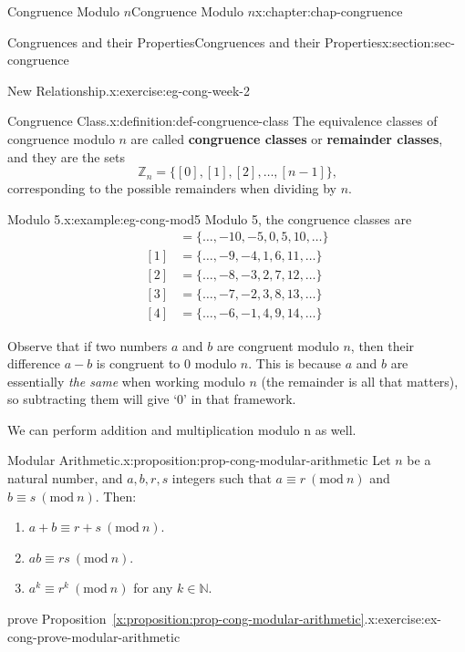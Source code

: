 \documentclass[oneside,10pt,]{book}
\newcommand{\xreffont}{\relax}
\newcommand{\terminology}[1]{\textbf{#1}}
\numberwithin{equation}{section}
\newcommand{\Mod}[1]{\ \left(\mathrm{mod}\ #1\right)}
\newcommand{\amp}{&}
\begin{document}
\begin{chapterptx}{Congruence Modulo \(n\)}{}{Congruence Modulo \(n\)}{}{}{x:chapter:chap-congruence}
\begin{sectionptx}{Congruences and their Properties}{}{Congruences and their Properties}{}{}{x:section:sec-congruence}
\begin{inlineexercise}{New Relationship.}{x:exercise:eg-cong-week-2}
\end{inlineexercise}
\begin{definition}{Congruence Class.}{x:definition:def-congruence-class}%
The equivalence classes of congruence modulo \(n\) are called \terminology{congruence classes} or \terminology{remainder classes}, and they are the sets%
\begin{equation*}
\mathbb{Z}_n = \{[0],[1],[2],\ldots,[n-1]\}\text{,}
\end{equation*}
corresponding to the possible remainders when dividing by \(n\). \label{g:notation:id444993}%
\end{definition}
\begin{example}{Modulo 5.}{x:example:eg-cong-mod5}%
Modulo 5, the congruence classes are%
\begin{align*}
[0] \amp = \{\ldots,-10,-5,0,5,10,\ldots\}\\
[1] \amp = \{\ldots,-9,-4,1,6,11,\ldots\}\\
[2] \amp = \{\ldots,-8,-3,2,7,12,\ldots\}\\
[3] \amp = \{\ldots,-7,-2,3,8,13,\ldots\}\\
[4] \amp = \{\ldots,-6,-1,4,9,14,\ldots\}
\end{align*}
%
\end{example}
Observe that if two numbers \(a\) and \(b\) are congruent modulo \(n\), then their difference \(a-b\) is congruent to 0 modulo \(n\). This is because \(a\) and \(b\) are essentially \emph{the same} when working modulo \(n\) (the remainder is all that matters), so subtracting them will give `0' in that framework.%
\par
We can perform addition and multiplication modulo \textdollar{}n\textdollar{} as well.%
\begin{proposition}{Modular Arithmetic.}{}{x:proposition:prop-cong-modular-arithmetic}%
Let \(n\) be a natural number, and \(a, b, r, s\) integers such that \(a \equiv r \Mod{n}\) and \(b \equiv s \Mod{n}\). Then:%
\begin{enumerate}[label=(\alph*)]
\item{}\(a + b \equiv r + s \Mod{n}\).%
\item{}\(ab \equiv rs \Mod{n}\).%
\item{}\(a^k \equiv r^k \Mod{n}\) for any \(k \in \mathbb{N}\).%
\end{enumerate}
%
\end{proposition}
\begin{inlineexercise}{prove Proposition~{\xreffont\ref*{x:proposition:prop-cong-modular-arithmetic}}.}{x:exercise:ex-cong-prove-modular-arithmetic}%

\end{inlineexercise}
\end{sectionptx}
\end{chapterptx}
\end{document}
